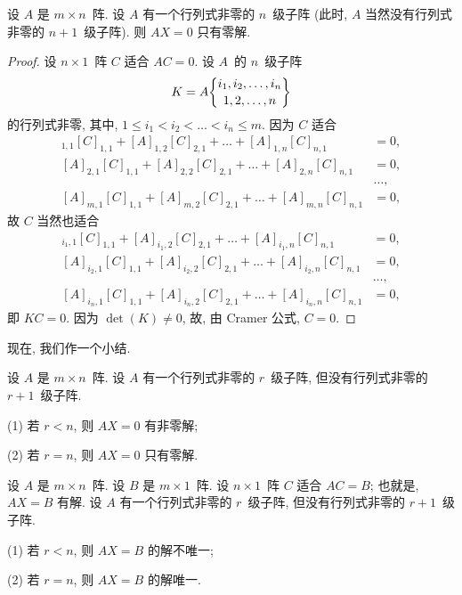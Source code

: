 \documentclass[../libro.tex]{subfiles}
\begin{document}
\begin{theorem}
    设 \(A\) 是 \(m \times n\)~阵.
    设 \(A\) 有一个行列式非零的 \(n\)~级子阵
    (此时, \(A\) 当然没有行列式非零的 \(n+1\)~级子阵).
    则 \(AX = 0\) 只有零解.
\end{theorem}

\begin{proof}
    设 \(n \times 1\)~阵 \(C\) 适合 \(AC = 0\).
    设 \(A\)~的 \(n\)~级子阵
    \begin{align*}
        K = A\submat{i_1,i_2,\dots,i_n}{1,2,\dots,n}
    \end{align*}
    的行列式非零,
    其中,
    \(1 \leq i_1 < i_2 < \dots < i_n \leq m\).
    因为 \(C\) 适合
    \begin{align*}
        [A]_{1,1} [C]_{1,1} + [A]_{1,2} [C]_{2,1} + \dots + [A]_{1,n} [C]_{n,1} & = 0,   \\
        [A]_{2,1} [C]_{1,1} + [A]_{2,2} [C]_{2,1} + \dots + [A]_{2,n} [C]_{n,1} & = 0,   \\
        & \dots, \\
        [A]_{m,1} [C]_{1,1} + [A]_{m,2} [C]_{2,1} + \dots + [A]_{m,n} [C]_{n,1} & = 0,
    \end{align*}
    故 \(C\) 当然也适合
    \begin{align*}
        [A]_{i_1,1} [C]_{1,1} + [A]_{i_1,2} [C]_{2,1} + \dots + [A]_{i_1,n} [C]_{n,1} & = 0,   \\
        [A]_{i_2,1} [C]_{1,1} + [A]_{i_2,2} [C]_{2,1} + \dots + [A]_{i_2,n} [C]_{n,1} & = 0,   \\
        & \dots, \\
        [A]_{i_n,1} [C]_{1,1} + [A]_{i_n,2} [C]_{2,1} + \dots + [A]_{i_n,n} [C]_{n,1} & = 0,
    \end{align*}
    即 \(KC = 0\).
    因为 \(\det {(K)} \neq 0\),
    故, 由 Cramer 公式,
    \(C = 0\).
\end{proof}

现在, 我们作一个小结.

\begin{theorem}
    设 \(A\) 是 \(m \times n\)~阵.
    设 \(A\) 有一个行列式非零的 \(r\)~级子阵,
    但没有行列式非零的 \(r+1\)~级子阵.

    (1)
    若 \(r < n\),
    则 \(AX = 0\) 有非零解;

    (2)
    若 \(r = n\),
    则 \(AX = 0\) 只有零解.
\end{theorem}

\begin{theorem}
    设 \(A\) 是 \(m \times n\)~阵.
    设 \(B\) 是 \(m \times 1\)~阵.
    设 \(n \times 1\)~阵 \(C\) 适合 \(AC = B\);
    也就是, \(AX = B\) 有解.
    设 \(A\) 有一个行列式非零的 \(r\)~级子阵,
    但没有行列式非零的 \(r+1\)~级子阵.

    (1)
    若 \(r < n\),
    则 \(AX = B\) 的解不唯一;

    (2)
    若 \(r = n\),
    则 \(AX = B\) 的解唯一.
\end{theorem}
\end{document}
